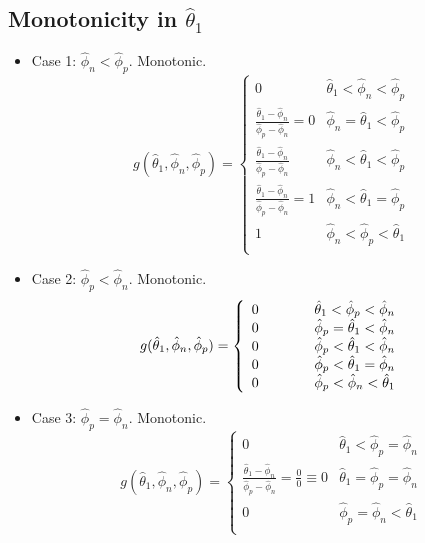 \subsection{Monotonicity in \texorpdfstring{\( \hat{\theta}_1 \)}{θ1}}


\begin{itemize}
	\item Case 1: \( \hat{\phi}_n < \hat{\phi}_p \). Monotonic. \\
\begin{equation}
g(\hat{\theta}_1, \hat{\phi}_n, \hat{\phi}_p)
=
\left\{
\begin{array}{ll}
0 & \hat{\theta}_1 < \hat{\phi}_n < \hat{\phi}_p  \\
\frac{\hat{\theta}_1 - \hat{\phi}_n}{\hat{\phi}_p - \hat{\phi}_n} = 0 & \hat{\phi}_n = \hat{\theta}_1 < \hat{\phi}_p \\
\frac{\hat{\theta}_1 - \hat{\phi}_n}{\hat{\phi}_p - \hat{\phi}_n} &	\hat{\phi}_n < \hat{\theta}_1 < \hat{\phi}_p \\
\frac{\hat{\theta}_1 - \hat{\phi}_n}{\hat{\phi}_p - \hat{\phi}_n} = 1 & \hat{\phi}_n < \hat{\theta}_1 = \hat{\phi}_p \\
1 & \hat{\phi}_n < \hat{\phi}_p < \hat{\theta}_1 \\
\end{array}
\right.
\end{equation}

\item Case 2: \( \hat{\phi}_p < \hat{\phi}_n \). Monotonic. \\
\begin{equation}
g(\hat{\theta}_1, \hat{\phi}_n, \hat{\phi}_p)
=
\left\{
\begin{array}{ll}
0 \hspace*{3em} & \hat{\theta}_1 < \hat{\phi}_p < \hat{\phi}_n  \\
0 & \hat{\phi}_p = \hat{\theta}_1 < \hat{\phi}_n \\
0 &	\hat{\phi}_p < \hat{\theta}_1 < \hat{\phi}_n \\
0 & \hat{\phi}_p < \hat{\theta}_1 = \hat{\phi}_n \\
0 & \hat{\phi}_p < \hat{\phi}_n < \hat{\theta}_1 \\
\end{array}
\right.
\end{equation}

\item Case 3: \( \hat{\phi}_p = \hat{\phi}_n \). Monotonic. \\
\begin{equation}
g(\hat{\theta}_1, \hat{\phi}_n, \hat{\phi}_p)
=
\left\{
\begin{array}{ll}
0 & \hat{\theta}_1 < \hat{\phi}_p = \hat{\phi}_n	\\
\frac{\hat{\theta}_1 - \hat{\phi}_n}{\hat{\phi}_p - \hat{\phi}_n} = \frac{0}{0} \equiv 0 & \hat{\theta}_1 = \hat{\phi}_p = \hat{\phi}_n 	\\
0 & \hat{\phi}_p = \hat{\phi}_n < \hat{\theta}_1	\\
\end{array}
\right.
\end{equation}
\end{itemize}

